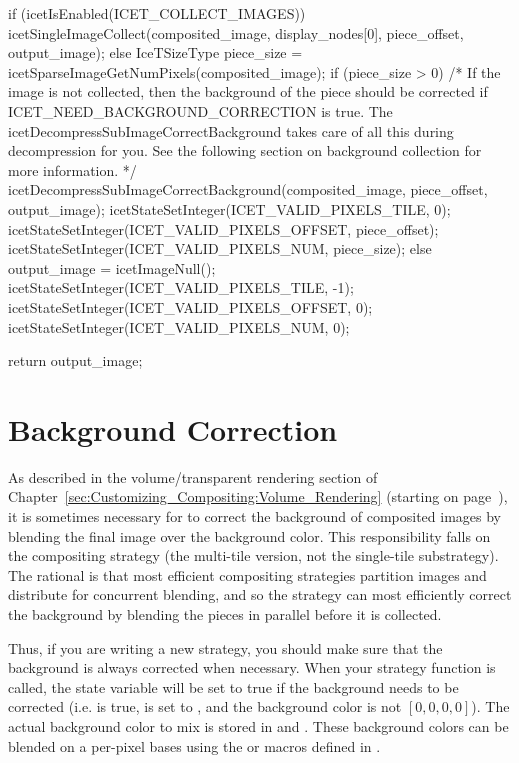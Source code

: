 \begin{code}
{  if (icetIsEnabled(ICET_COLLECT_IMAGES)) {
    icetSingleImageCollect(composited_image,
                           display_nodes[0],
                           piece_offset,
                           output_image);
  } else {
    IceTSizeType piece_size = icetSparseImageGetNumPixels(composited_image);
    if (piece_size > 0) {
      /* If the image is not collected, then the background of the piece
         should be corrected if ICET_NEED_BACKGROUND_CORRECTION is true.
         The icetDecompressSubImageCorrectBackground takes care of all this
         during decompression for you.  See the following section on
         background collection for more information. */
      icetDecompressSubImageCorrectBackground(composited_image,
                                              piece_offset,
                                              output_image);
      icetStateSetInteger(ICET_VALID_PIXELS_TILE, 0);
      icetStateSetInteger(ICET_VALID_PIXELS_OFFSET, piece_offset);
      icetStateSetInteger(ICET_VALID_PIXELS_NUM, piece_size);
    } else {
      output_image = icetImageNull();
      icetStateSetInteger(ICET_VALID_PIXELS_TILE, -1);
      icetStateSetInteger(ICET_VALID_PIXELS_OFFSET, 0);
      icetStateSetInteger(ICET_VALID_PIXELS_NUM, 0);
    }
  }

  return output_image;
}
\end{code}


\section{Background Correction}

As described in the volume/transparent rendering section of
Chapter~\ref{sec:Customizing_Compositing:Volume_Rendering} (starting on
page~\pageref{sec:Customizing_Compositing:Volume_Rendering}), it is
sometimes necessary for \IceT to correct the background of composited
images by blending the final image over the background color.  This
responsibility falls on the compositing strategy (the multi-tile version,
not the single-tile substrategy).  The rational is that most efficient
compositing strategies partition images and distribute for concurrent
blending, and so the strategy can most efficiently correct the background
by blending the pieces in parallel before it is collected.

Thus, if you are writing a new strategy, you should make sure that the
background is always corrected when necessary.  When your strategy function
is called, the state variable 
will be set to true if the background needs to be corrected
(i.e.  is true,
 is set to ,
and the background color is not $[0, 0, 0, 0]$).  The actual background
color to mix is stored in  and
.  These background colors can
be blended on a per-pixel bases using the  or
 macros defined in
.

